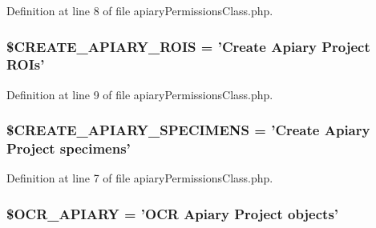 Definition at line 8 of file apiaryPermissionsClass.php.

\hypertarget{classapiary_permissions_class_a0569a7962c52e670222700a92386363c}{
\subsubsection[{\$CREATE\_\-APIARY\_\-ROIS}]{\setlength{\rightskip}{0pt plus 5cm}\$CREATE\_\-APIARY\_\-ROIS = 'Create Apiary Project ROIs'}}
\label{classapiary_permissions_class_a0569a7962c52e670222700a92386363c}


Definition at line 9 of file apiaryPermissionsClass.php.

\hypertarget{classapiary_permissions_class_af8d6246e918ba9bf893ad8853638c846}{
\subsubsection[{\$CREATE\_\-APIARY\_\-SPECIMENS}]{\setlength{\rightskip}{0pt plus 5cm}\$CREATE\_\-APIARY\_\-SPECIMENS = 'Create Apiary Project specimens'}}
\label{classapiary_permissions_class_af8d6246e918ba9bf893ad8853638c846}


Definition at line 7 of file apiaryPermissionsClass.php.

\hypertarget{classapiary_permissions_class_a483814936bf3f97b10a1522d74045346}{
\subsubsection[{\$OCR\_\-APIARY}]{\setlength{\rightskip}{0pt plus 5cm}\$OCR\_\-APIARY = 'OCR Apiary Project objects'}}
\label{classapiary_permissions_class_a483814936bf3f97b10a1522d74045346}


